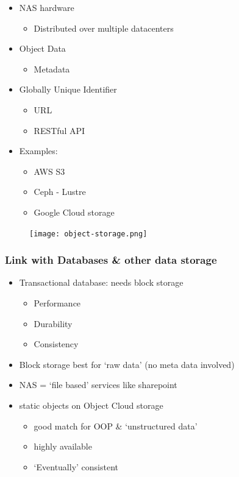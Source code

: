 \documentclass{article}
\begin{document}
\begin{itemize}
    \item NAS hardware
    \begin{itemize}
        \item Distributed over multiple datacenters
    \end{itemize}
    \item Object Data
    \begin{itemize}
        \item Metadata
    \end{itemize}
    \item Globally Unique Identifier
    \begin{itemize}
        \item URL
        \item RESTful API
    \end{itemize}
    \item Examples:
    \begin{itemize}
        \item AWS S3
        \item Ceph - Lustre
        \item Google Cloud storage
    \end{itemize}
\end{itemize}

\begin{figure}[H]
    \centering
    \texttt{[image: object-storage.png]}
    \caption{}
\end{figure}

\subsubsection{Link with Databases \& other data storage}





\begin{itemize}
    \item Transactional database: needs block storage
    \begin{itemize}
        \item Performance
        \item Durability
        \item Consistency
    \end{itemize}
    \item Block storage best for `raw data' (no meta data involved)
    \item NAS = `file based' services like sharepoint
    \item static objects on Object Cloud storage
    \begin{itemize}
        \item good match for OOP \& `unstructured data'
        \item highly available
        \item `Eventually' consistent
    \end{itemize}
\end{itemize}
\end{document}
